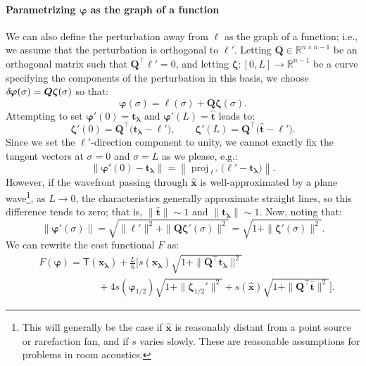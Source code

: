 \documentclass{siamart190516}
\renewcommand{\phi}{\varphi}
\newcommand{\m}[1]{\boldsymbol{#1}}
\newcommand{\xhat}{\hat{\m{x}}}
\newcommand{\xlam}{\m{x}_{\m{\lambda}}}
\newcommand{\that}{\hat{\m{t}}}
\newcommand{\tlam}{\m{t}_{\m{\lambda}}}
\newcommand{\half}{1/2}
\newcommand{\dphi}{\delta\hspace{-0.1em}\m{\phi}}
\newcommand{\mphi}{\m{\phi}}
\newcommand{\mell}{\m{\ell}}
\DeclareMathOperator{\proj}{proj}
\begin{document}
\paragraph{Parametrizing $\mphi$ as the graph of a function} We can
also define the perturbation away from $\mell$ as the graph of a
function; i.e., we assume that the perturbation is orthogonal to
$\mell'$. Letting $\m{Q} \in \mathbb{R}^{n \times n-1}$ be an
orthogonal matrix such that $\m{Q}^\top \mell' = 0$, and letting
$\m{\zeta} : [0, L] \to \mathbb{R}^{n-1}$ be a curve specifying the
components of the perturbation in this basis, we choose
$\dphi(\sigma) = \m{Q}\m{\zeta}(\sigma)$ so that:
\begin{equation}
  \mphi(\sigma) = \mell(\sigma) + \m{Q} \m{\zeta}(\sigma).
\end{equation}
Attempting to set $\mphi'(0) = \tlam$ and $\mphi'(L) = \that$
leads to:
\begin{equation}
  \m{\zeta}'(0) = \m{Q}^\top \big(\tlam - \mell'\big), \qquad \m{\zeta}'(L) = \m{Q}^\top \big(\that - \mell'\big).
\end{equation}
Since we set the $\mell'$-direction component to unity, we cannot
exactly fix the tangent vectors at $\sigma = 0$ and $\sigma = L$ as we
please, e.g.:
\begin{equation}\label{eq:error-in-tangent-vector}
  \|\mphi'(0) - \tlam\| = \left\|\proj_{\mell'}\big(\mell' - \tlam\big)\right\|.
\end{equation}
However, if the wavefront passing through $\xhat$ is well-approximated
by a plane wave\footnote{This will generally be the case if $\xhat$ is
  reasonably distant from a point source or rarefaction fan, and if
  $s$ varies slowly. These are reasonable assumptions for problems in
  room acoustics.}, as $L \to 0$, the characteristics generally
approximate straight lines, so this difference tends to zero; that is,
$\|\that\| \sim 1$ and $\|\tlam\| \sim 1$. Now, noting that:
\begin{equation}
  \|\mphi'(\sigma)\| = \sqrt{\|\mell'\|^2 + \|\m{Q}\m{\zeta}'(\sigma)\|^2} = \sqrt{1 + \|\m{\zeta}'(\sigma)\|^2}.
\end{equation}
We can rewrite the cost functional $F$ as:
\begin{equation}
  \begin{split}
    &F(\mphi) = \mathsf{T}(\xlam) + \frac{L}{6}\Bigg[s(\xlam)\sqrt{1 + \|\m{Q}^\top\tlam\|^2} \\
    &\hspace{6em} + 4 s(\mphi_{\half}) \sqrt{1 + \|\m{\zeta}_{\half}'\|^2} + s(\xhat)\sqrt{1 + \|\m{Q}^\top\that\|^2}\Bigg].
  \end{split}
\end{equation}
\end{document}
